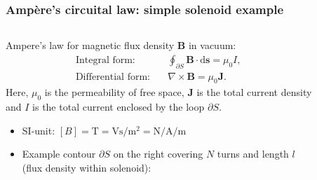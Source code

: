 \begin{frame}
	\frametitle{Amp\`ere's circuital law: simple solenoid example}
	\begin{columns}
		\begin{column}{0.575\textwidth}
			Ampere's law for magnetic flux density $\bm{B}$ in vacuum:
            \begin{align}
                \mbox{Integral form:} \quad &\oint_{\partial S} \bm{B} \cdot \mathrm{d}\bm{s} = \mu_0 I,\\
                \mbox{Differential form:} \quad &\nabla \times \bm{B} = \mu_0\bm{J}. 
            \end{align}
            Here, $\mu_0$ is the permeability of free space, $\bm{J}$ is the total current density and $I$ is the total current enclosed by the loop $\partial S$. 
            \vspace{0.25cm}
            \begin{itemize}
                \item<2-> SI-unit: $[B] = \si{\tesla} = \si{\volt\second\per\metre\squared} = \si{\newton\per\ampere\per\metre}$
                \item<3-> Example contour $\partial S$  on the right covering $N$ turns and length $l$ (flux density within solenoid):
            \end{itemize}
		\end{column}
        \hfill
		\begin{column}{0.425\textwidth}
            \vspace{-0.2cm}
			\begin{figure}
				\centering

\end{figure}
\end{column}
\end{columns}
\end{frame}
